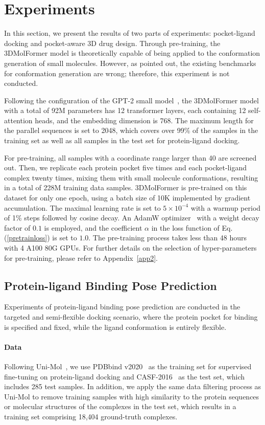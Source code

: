\section{Experiments}
\label{experiments}
In this section, we present the results of two parts of experiments: pocket-ligand docking and pocket-aware 3D drug design. Through pre-training, the 3DMolFormer model is theoretically capable of being applied to the conformation generation of small molecules. However, as \cite{ConformationWrong} pointed out, the existing benchmarks for conformation generation are wrong; therefore, this experiment is not conducted.

Following the configuration of the GPT-2 small model~\citep{GPT-2}, the 3DMolFormer model with a total of 92M parameters has 12 transformer layers, each containing 12 self-attention heads, and the embedding dimension is 768. The maximum length for the parallel sequences is set to 2048, which covers over 99\% of the samples in the training set as well as all samples in the test set for protein-ligand docking.

For pre-training, all samples with a coordinate range larger than 40 are screened out. Then, we replicate each protein pocket five times and each pocket-ligand complex twenty times, mixing them with small molecule conformations, resulting in a total of 228M training data samples. 3DMolFormer is pre-trained on this dataset for only one epoch, using a batch size of 10K implemented by gradient accumulation. The maximal learning rate is set to $5\times10^{-4}$ with a warmup period of 1\% steps followed by cosine decay. An AdamW optimizer~\cite{AdamW} with a weight decay factor of $0.1$ is employed, and the coefficient $\alpha$ in the loss function of Eq. (\ref{pretrainloss}) is set to $1.0$. The pre-training process takes less than 48 hours with 4 A100 80G GPUs. For further details on the selection of hyper-parameters for pre-training, please refer to Appendix~\ref{app2}.

\subsection{Protein-ligand Binding Pose Prediction}
\label{exp-docking}
Experiments of protein-ligand binding pose prediction are conducted in the targeted and semi-flexible docking scenario, where the protein pocket for binding is specified and fixed, while the ligand conformation is entirely flexible.

\paragraph{Data} Following Uni-Mol~\citep{Uni-Mol}, we use PDBbind v2020~\citep{PDBbind} as the training set for supervised fine-tuning on protein-ligand docking and CASF-2016~\citep{CASF-2016} as the test set, which includes 285 test samples. In addition, we apply the same data filtering process as Uni-Mol to remove training samples with high similarity to the protein sequences or molecular structures of the complexes in the test set, which results in a training set comprising 18,404 ground-truth complexes. 

